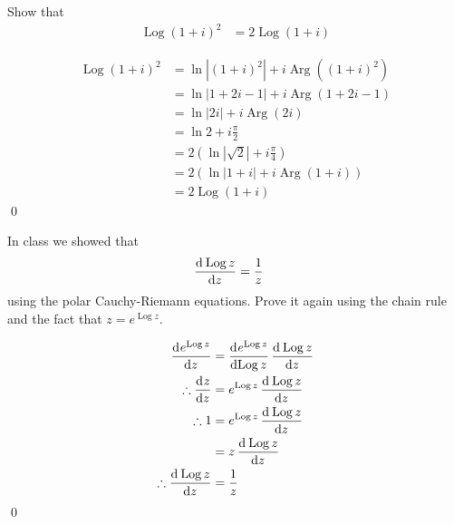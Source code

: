 \documentclass[fleqn, a4paper, 11pt, oneside]{amsart}
\theoremstyle{definition}
\theoremstyle{theorem}
\DeclareMathOperator{\Arg}{Arg}
\DeclareMathOperator{\Log}{Log}
\begin{document}
\setcounter{question}{3}
\begin{question}
	Show that
	\begin{align*}
		\Log (1 + i)^2 & = 2 \Log(1 + i)
	\end{align*}
\end{question}

\begin{solution}
	\begin{align*}
		\Log (1 + i)^2 & = \ln\left| (1 + i)^2 \right| + i \Arg\left( (1 + i)^2 \right)     \\
                               & = \ln\left| 1 + 2 i - 1 \right| + i \Arg\left( 1 + 2 i - 1 \right) \\
                               & = \ln|2 i| + i \Arg(2 i)                                           \\
                               & = \ln 2 + i \frac{\pi}{2}                                          \\
                               & = 2 \left( \ln\left| \sqrt{2} \right| + i \frac{\pi}{4} \right)    \\
                               & = 2 \left( \ln|1 + i| + i \Arg(1 + i) \right)                      \\
                               & = 2 \Log(1 + i)
	\end{align*}
	\qed
\end{solution}

\setcounter{question}{4}
\begin{question}
	In class we showed that
	\begin{align*}
		\dod{\Log z}{z} & = \frac{1}{z}
	\end{align*}
	using the polar Cauchy-Riemann equations.
	Prove it again using the chain rule and the fact that $z = e^{\Log z}$.
\end{question}

\begin{solution}
	\begin{align*}
		\dod{e^{\Log z}}{z}        & = \dod{e^{\Log z}}{\Log z} \dod{\Log z}{z} \\
		\therefore \dod{z}{z}      & = e^{\Log z} \dod{\Log z}{z}               \\
		\therefore 1               & = e^{\Log z} \dod{\Log z}{z}               \\
                                           & = z \dod{\Log z}{z}                        \\
		\therefore \dod{\Log z}{z} & = \frac{1}{z}
	\end{align*}
	\qed
\end{solution}
\end{document}
